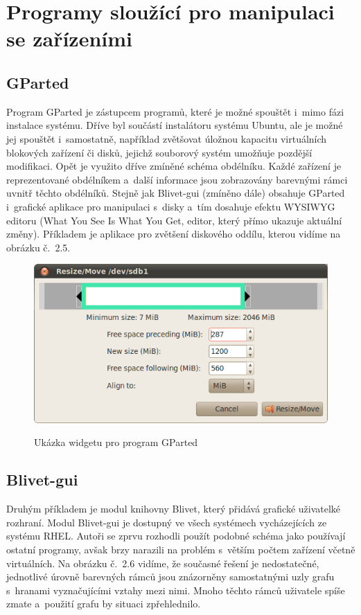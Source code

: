 \documentclass[color,table,oneside,nolot,nolof]{fithesis}
\begin{document}
\section{Programy sloužící pro manipulaci se zařízeními}

\subsection{GParted}
	Program GParted je zástupcem programů, které je možné spouštět i~mimo fázi instalace systému. Dříve byl součástí instalátoru systému Ubuntu\cite{ubuntu-gparted}, ale je možné jej spouštět 
	i~samostatně, například 
	zvětšovat úložnou kapacitu virtuálních blokových zařízení či disků, jejichž souborový systém umožňuje pozdější modifikaci. Opět je využito dříve zmíněné schéma obdélníku. Každé zařízení je reprezentované
	obdélníkem a~další informace jsou zobrazovány barevnými rámci uvnitř těchto obdélníků. Stejně jak Blivet-gui (zmíněno dále) obsahuje GParted i~grafické aplikace pro manipulaci s~disky 
	a~tím dosahuje efektu WYSIWYG editoru (What You See Is What You Get, editor, který přímo ukazuje aktuální změny). Příkladem je aplikace pro zvětšení diskového oddílu, kterou vidíme na obrázku č.~2.5.

 \begin{figure}[h!]
	 \label{fig:gparted}
	 \caption{Ukázka widgetu pro program GParted~\cite{GParted}}
	 \centering
	 \includegraphics[width=.8\columnwidth]{pictures/gparted-5-big.png}\\
 \end{figure}

 \subsection{Blivet-gui}

 Druhým příkladem je modul knihovny Blivet, který přidává grafické uživatelké rozhraní. Modul Blivet-gui je dostupný ve všech systémech vycházejících ze systému RHEL. Autoři 
 se zprvu rozhodli použít podobné schéma jako používají ostatní programy, avšak brzy narazili na problém s~větším počtem zařízení včetně virtuálních. Na obrázku č.~2.6 vidíme, že současné řešení je nedostatečné, jednotlivé úrovně 
 barevných rámců 
 jsou znázorněny samostatnými uzly grafu s~hranami vyznačujícími vztahy mezi nimi. Mnoho těchto rámců uživatele spíše zmate a~použití grafu by situaci zpřehlednilo.
\end{document}
